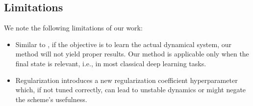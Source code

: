 \subsection{Limitations}
\label{sec:limitations}

We note the following limitations of our work:
%
\begin{itemize}
  \item Similar to \citet{pal2021opening}, if the objective is to learn the actual dynamical system, our method will not yield proper results. Our method is applicable only when the final state is relevant, i.e., in most classical deep learning tasks.

  \item Regularization introduces a new regularization coefficient hyperparameter which, if not tuned correctly, can lead to unstable dynamics or might negate the scheme's usefulness.
\end{itemize}
%

